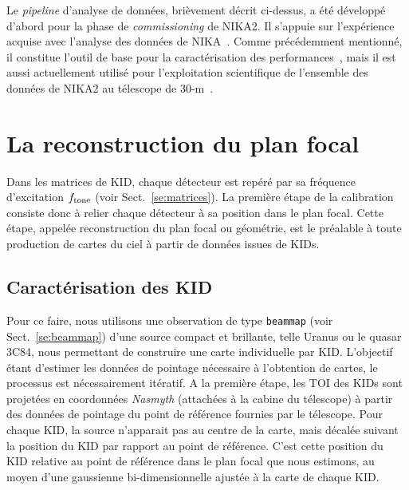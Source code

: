 Le \emph{pipeline} d'analyse de données, brièvement décrit
ci-dessus, a été développé d'abord pour la phase de
\emph{commissioning} de NIKA2. Il s'appuie sur l'expérience acquise
avec l'analyse des données de NIKA~\citep{Catalano2014,
  Adam2014}. Comme précédemment mentionné, il constitue l'outil de
base pour la caractérisation des
performances~\citep{Adam2018, Perotto2019, Ponthieu2020}, mais il est
aussi actuellement utilisé pour l'exploitation scientifique de
l'ensemble des données de NIKA2 au télescope de
30-m~\citep{Ruppin2018, Ruppin2019c}.  


%
%
\section{La reconstruction du plan focal}
\label{se:fov_geometry}

Dans les matrices de KID, chaque détecteur est repéré par sa fréquence
d'excitation $f_{\rm{tone}}$ (voir Sect.~\ref{se:matrices}). La
première étape de la calibration consiste donc à relier chaque
détecteur à sa position dans le plan focal. Cette
étape, appelée reconstruction du plan focal ou géométrie, est le
préalable à toute production de cartes du ciel à partir de données
issues de KIDs.

\subsection{Caractérisation des KID}
\label{se:KID_pointing}

Pour ce faire, nous utilisons une observation de type {\tt beammap}
(voir Sect.~\ref{se:beammap}) d'une source compact et brillante, telle
Uranus ou le quasar 3C84, nous permettant de construire une carte
individuelle par KID. L'objectif étant d'estimer les données de
pointage nécessaire à l'obtention de cartes, le processus est
nécessairement itératif. A la première étape, les TOI des KIDs sont
projetées en coordonnées \emph{Nasmyth} (attachées à la cabine du
télescope) à partir des données de pointage du point de référence
fournies par le télescope. Pour chaque KID, la source n'apparait pas
au centre de la carte, mais décalée suivant la position du KID par
rapport au point de référence. C'est cette position du KID relative au
point de référence dans le plan focal que nous estimons, au moyen d'une
gaussienne bi-dimensionnelle ajustée à la carte de chaque KID. 

